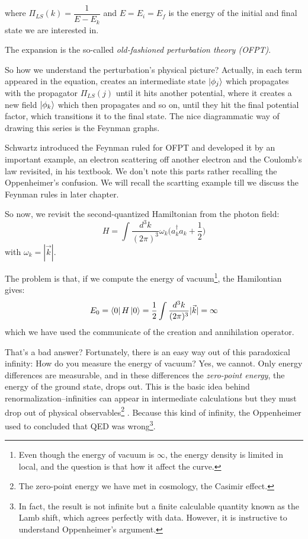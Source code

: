 \documentclass[12pt,openany]{book}
\begin{document}
	where $\Pi_{LS}(k)=\dfrac{1}{E-E_k}$ and $E=E_i=E_f$ is the energy of the initial and final state we are interested in.\par 
	The expansion is the so-called \textit{old-fashioned perturbation theory (OFPT)}.\par 
	So how we understand the perturbation's physical picture? Actually, in each term appeared in the equation, creates
	an intermediate state $\ket{\phi_j}$ which propagates with the propagator $\Pi_{LS}(j)$ until it hits another potential, where it creates a new field $\ket{\phi_k}$ which then 
	propagates and so on, until they hit the final potential factor, which transitions it to the final state. The nice diagrammatic way of drawing this series is the Feynman graphs.\par 
	Schwartz introduced the Feynman ruled for OFPT and developed it by an important example, an electron scattering off another electron and the Coulomb's law revisited, in his textbook. We don't 
	note this parts rather recalling the Oppenheimer's confusion. We will recall the scartting example till we discuss the 
	Feynman rules in later chapter.\par 
	So now, we revisit the second-quantized Hamiltonian from the photon field:
	\begin{equation}
		H=\int\frac{d^3k}{(2\pi)^3}\omega_k\big(a_k^\dagger a_k+\frac{1}{2}\big)
	\end{equation}
	with $\omega_k=|\vec{k}|$.\par 
	The problem is that, if we compute the energy of vacuum\footnote{Even though the energy of vacuum is $\infty$, the energy density is limited in local, and the question is that how it affect the curve.}, the Hamilontian gives:
	\begin{equation}
		E_0=\bra{0}H\ket{0}=\frac{1}{2}\int\frac{d^3k}{(2\pi)^3}|\vec{k}|=\infty
	\end{equation}
	which we have used the communicate of the creation and annihilation operator.\par 
	That's a bad answer? Fortunately, there is an easy way out of this paradoxical infinity: How do you measure the energy of vacuum?
	Yes, we cannot. Only energy differences are measurable, and in these differences the \textit{zero-point energy}, the energy of the ground state, drops out.
	This is the basic idea behind renormalization--infinities can appear in intermediate calculations but they must drop out of physical observables\footnote{The zero-point energy we have met in cosmology, the Casimir effect.}
	. Because this kind of infinity, the Oppenheimer used to concluded that QED was wrong\footnote{In fact, the result is not infinite but a finite calculable quantity known as the Lamb shift, which agrees perfectly with data. However, it is instructive to understand Oppenheimer’s argument.}.\par 
\end{document}
